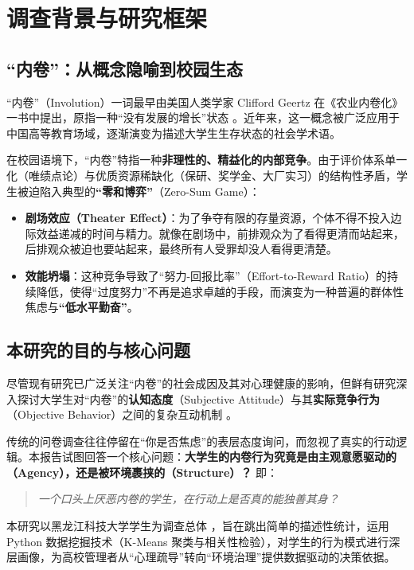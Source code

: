 \documentclass[win,thesis]{hustreport} %
\begin{document}
\section{调查背景与研究框架}

\subsection{“内卷”：从概念隐喻到校园生态}
“内卷”（Involution）一词最早由美国人类学家 Clifford Geertz 在《农业内卷化》一书中提出，原指一种“没有发展的增长”状态 。近年来，这一概念被广泛应用于中国高等教育场域，逐渐演变为描述大学生生存状态的社会学术语。

在校园语境下，“内卷”特指一种\textbf{非理性的、精益化的内部竞争}。由于评价体系单一化（唯绩点论）与优质资源稀缺化（保研、奖学金、大厂实习）的结构性矛盾，学生被迫陷入典型的\textbf{“零和博弈”}（Zero-Sum Game）：
\begin{itemize}
	\item \textbf{剧场效应（Theater Effect）}：为了争夺有限的存量资源，个体不得不投入边际效益递减的时间与精力。就像在剧场中，前排观众为了看得更清而站起来，后排观众被迫也要站起来，最终所有人受罪却没人看得更清楚。
	\item \textbf{效能坍塌}：这种竞争导致了“努力-回报比率”（Effort-to-Reward Ratio）的持续降低，使得“过度努力”不再是追求卓越的手段，而演变为一种普遍的群体性焦虑与\textbf{“低水平勤奋”}。
\end{itemize}

\subsection{本研究的目的与核心问题}
尽管现有研究已广泛关注“内卷”的社会成因及其对心理健康的影响，但鲜有研究深入探讨大学生对“内卷”的\textbf{认知态度}（Subjective Attitude）与其\textbf{实际竞争行为}（Objective Behavior）之间的复杂互动机制 。

传统的问卷调查往往停留在“你是否焦虑”的表层态度询问，而忽视了真实的行动逻辑。本报告试图回答一个核心问题：\textbf{大学生的内卷行为究竟是由主观意愿驱动的（Agency），还是被环境裹挟的（Structure）？} 即：
\begin{quote}
	\textit{一个口头上厌恶内卷的学生，在行动上是否真的能独善其身？}
\end{quote}

本研究以黑龙江科技大学学生为调查总体 ，旨在跳出简单的描述性统计，运用 Python 数据挖掘技术（K-Means 聚类与相关性检验），对学生的行为模式进行深层画像，为高校管理者从“心理疏导”转向“环境治理”提供数据驱动的决策依据。
\end{document}
